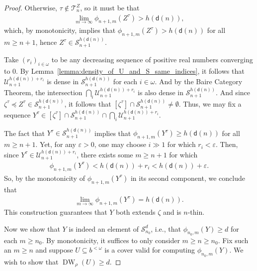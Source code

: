 \begin{proof}
    Otherwise, $\tau \not\in \mathcal{T}^Z_n$, so it must be that
    \begin{align*}
        \lim_{m \to \infty} \phi_{n + 1, m}(Z^\tau) > h(\mathsf{d}(n)),
    \end{align*}
    which, by monotonicity, implies that $\phi_{n + 1, m}(Z^\tau) > h(\mathsf{d}(n))$ for all $m \geq n + 1$, hence $Z^\tau \in \mathcal{S}_{n + 1}^{h(\mathsf{d}(n))}.$
    
    Take $(r_i)_{i \in \omega}$ to be any decreasing sequence of positive real numbers converging to $0$. By Lemma~\ref{lemma:density_of_U_and_S_same_indices}, it follows that $\mathcal{U}_{n + 1}^{h(\mathsf{d}(n)) + r_i}$ is dense in $\mathcal{S}_{n + 1}^{h(\mathsf{d}(n))}$ for each $i \in \omega$. And by the Baire Category Theorem, the intersection $\bigcap_i \mathcal{U}_{n + 1}^{h(\mathsf{d}(n)) + r_i}$ is also dense in $\mathcal{S}_{n + 1}^{h(\mathsf{d}(n))}$. And since $\zeta^\tau \preceq Z^\tau \in \mathcal{S}_{n + 1}^{h(\mathsf{d}(n))}$, it follows that $[\zeta^\tau] \cap \mathcal{S}_{n + 1}^{h(\mathsf{d}(n))} \neq \emptyset$. Thus, we may fix a sequence $Y^\tau \in [\zeta^\tau] \cap  \mathcal{S}_{n + 1}^{h(\mathsf{d}(n))} \cap \bigcap_i \mathcal{U}_{n + 1}^{h(\mathsf{d}(n)) + r_i}$. 

    The fact that $Y^\tau \in \mathcal{S}_{n + 1}^{h(\mathsf{d}(n))}$ implies that $\phi_{n + 1, m}(Y^\tau) \geq h(\mathsf{d}(n))$ for all $m \geq n + 1$. Yet, for any $\varepsilon > 0$, one may choose $i \gg 1$ for which $r_i < \varepsilon$. Then, since $Y^\tau \in \mathcal{U}_{n + 1}^{h(\mathsf{d}(n)) + r_i}$, there exists some $m \geq n + 1$ for which 
    \begin{align*}
        \phi_{n + 1, m}(Y^\tau) < h(\mathsf{d}(n)) + r_i < h(\mathsf{d}(n)) + \varepsilon.
    \end{align*}
    So, by the monotonicity of $\phi_{n + 1, m}(Y^\tau)$ in its second component, we conclude that
    \begin{align*}
        \lim_{m \to \infty} \phi_{n + 1, m}(Y^\tau) = h(\mathsf{d}(n)).
    \end{align*}
    This construction guarantees that $Y$ both extends $\zeta$ and is $n$-thin.

    Now we show that $Y$ is indeed an element of $\mathcal{S}_{n_0}^d$, i.e., that $\phi_{n_0,  m}(Y) \geq d$ for each $m \geq n_0$. By monotonicity, it suffices to only consider $m \geq n \geq n_0$. Fix such an $m \geq n$ and suppose $U \subseteq b^{<\omega}$ is a cover valid for computing $\phi_{n_0, m}(Y)$. We wish to show that $\operatorname{DW}_\rho(U) \geq d$. 


\end{proof}
